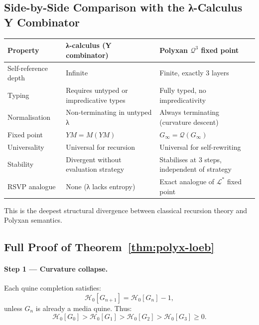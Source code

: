 \subsection{Side-by-Side Comparison with the λ-Calculus Y Combinator}

\begin{center}
\begin{tabular}{l|l|l}
\textbf{Property} &
\textbf{λ-calculus (Y combinator)} &
\textbf{Polyxan $\mathcal{Q}^3$ fixed point} \\
\hline
Self-reference depth &
Infinite &
Finite, exactly 3 layers \\
Typing &
Requires untyped or impredicative types &
Fully typed, no impredicativity \\
Normalisation &
Non-terminating in untyped λ &
Always terminating (curvature descent) \\
Fixed point &
$Y M = M(YM)$ &
$G_\infty = \mathcal{Q}(G_\infty)$ \\
Universality &
Universal for recursion &
Universal for self-rewriting \\
Stability &
Divergent without evaluation strategy &
Stabilises at $3$ steps, independent of strategy \\
RSVP analogue &
None (λ lacks entropy) &
Exact analogue of $\mathcal{L}^\ast$ fixed point
\end{tabular}
\end{center}

This is the deepest structural divergence between classical recursion theory and Polyxan semantics.

\subsection{Full Proof of Theorem~\ref{thm:polyx-loeb}}

\paragraph{Step 1 — Curvature collapse.}
Each quine completion satisfies:
\[
\mathcal{H}_0[G_{n+1}] = \mathcal{H}_0[G_n] - 1,
\]
unless $G_n$ is already a media quine.  
Thus:
\[
\mathcal{H}_0[G_0] > \mathcal{H}_0[G_1] > \mathcal{H}_0[G_2] > \mathcal{H}_0[G_3] \ge 0.
\]

